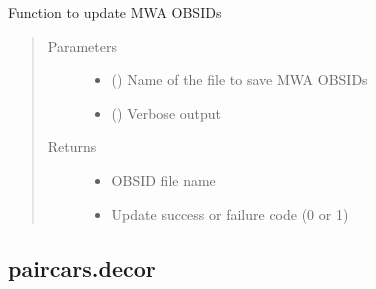 \documentclass[letterpaper,10pt,english]{sphinxmanual}
\begin{document}
\begin{fulllineitems}
\label{\detokenize{paircars:paircars.basic_func.update_mwa_obsids}}
\sphinxAtStartPar
Function to update MWA OBSIDs
\begin{quote}\begin{description}
\item[{Parameters}] \leavevmode\begin{itemize}
\item {} 
\sphinxAtStartPar
{} () \textendash{} Name of the file to save MWA OBSIDs

\item {} 
\sphinxAtStartPar
{} () \textendash{} Verbose output

\end{itemize}

\item[{Returns}] \leavevmode
\sphinxAtStartPar
\begin{itemize}
\item {} 
\sphinxAtStartPar
{} \textendash{} OBSID file name

\item {} 
\sphinxAtStartPar
{} \textendash{} Update success or failure code (0 or 1)

\end{itemize}


\end{description}\end{quote}

\end{fulllineitems}



\subsection{paircars.decor}
\label{\detokenize{paircars:module-paircars.decor}}\label{\detokenize{paircars:paircars-decor}}
\end{document}
